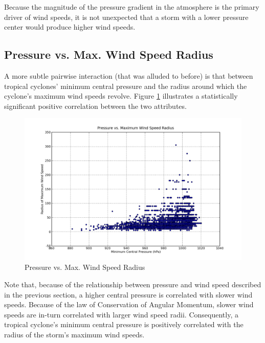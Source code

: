 \documentclass[letterpaper,twocolumn,10pt]{article}
\begin{document}
Because the magnitude of the pressure gradient in the atmosphere is the primary
driver of wind speeds, it is not unexpected that a storm with a lower
pressure center would produce higher wind speeds.


\subsection{Pressure vs. Max. Wind Speed Radius}
A more subtle pairwise interaction (that was alluded to before) is that between
tropical cyclones' minimum central pressure and the radius around which the 
cyclone's maximum wind speeds revolve. Figure \ref{pressure_vs_radius}
illustrates a statistically significant positive correlation between the two
attributes.
\begin{figure}[h!]
  \centering
  \includegraphics[scale=0.27]{pressure_vs_radius.png}
  \caption{Pressure vs. Max. Wind Speed Radius}
  \label{pressure_vs_radius}
\end{figure}

Note that, because of the relationship between pressure and wind speed described
in the previous section, a higher central pressure is correlated with slower
wind speeds. Because of the law of Conservation of Angular Momentum, slower
wind speeds are in-turn correlated with larger wind speed radii. Consequently,
a tropical cyclone's minimum central pressure is positively correlated with 
the radius of the storm's maximum wind speeds.





\end{document}
